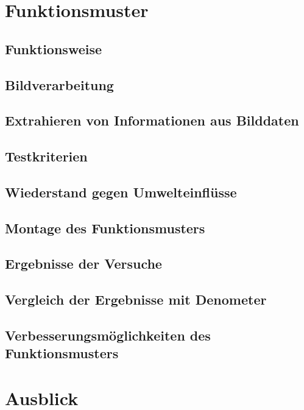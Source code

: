 \documentclass[a4paper,12pt]{article}
\begin{document}
\section{Funktionsmuster}

\subsection{Funktionsweise}

\subsection{Bildverarbeitung}


\subsection{Extrahieren von Informationen aus Bilddaten}


\subsection{Testkriterien}

\subsection{Wiederstand gegen Umwelteinflüsse}

\subsection{Montage des Funktionsmusters}

\subsection{Ergebnisse der Versuche}

\subsection{Vergleich der Ergebnisse mit Denometer}

\subsection{Verbesserungsmöglichkeiten des Funktionsmusters}

\newpage
\section{Ausblick}
\end{document}
